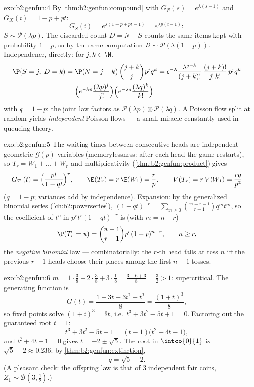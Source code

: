 \begin{solution}{exo:b2:genfun:4}
By \cref{thm:b2:genfun:compound} with $G_N(s) = e^{\lambda(s-1)}$
and $G_X(t) = 1 - p + pt$:
\[
G_S(t) = e^{\lambda(1 - p + pt - 1)} = e^{\lambda p(t - 1)} :
\]
$S \sim \mathcal{P}(\lambda p)$. The discarded count $D = N - S$
counts the same items kept with probability $1 - p$, so by the
same computation $D \sim \mathcal{P}(\lambda(1 - p))$.
Independence, directly: for $j, k \in \N$,
\begin{align*}
\P(S = j,\ D = k)
&= \P(N = j + k)\,\binom{j+k}{j}p^jq^k
= e^{-\lambda}\frac{\lambda^{j+k}}{(j+k)!}\,
\frac{(j+k)!}{j!\,k!}\,p^jq^k\\
&= \Bigl(e^{-\lambda p}\frac{(\lambda p)^j}{j!}\Bigr)
\Bigl(e^{-\lambda q}\frac{(\lambda q)^k}{k!}\Bigr)
\end{align*}
with $q = 1 - p$: the joint law factors as
$\mathcal{P}(\lambda p) \otimes \mathcal{P}(\lambda q)$. A Poisson
flow split at random yields \emph{independent} Poisson flows ---
a small miracle constantly used in queueing theory.
\end{solution}

\begin{solution}{exo:b2:genfun:5}
The waiting times between consecutive heads are independent
geometric $\mathcal{G}(p)$ variables (memorylessness: after each
head the game restarts), so $T_r = W_1 + \dots + W_r$ and
multiplicativity (\cref{thm:b2:genfun:product}) gives
\[
G_{T_r}(t) = \Bigl(\frac{pt}{1 - qt}\Bigr)^{r},
\qquad
\E(T_r) = r\,\E(W_1) = \frac rp,
\qquad
V(T_r) = r\,V(W_1) = \frac{rq}{p^2}
\]
($q = 1 - p$; variances add by independence). Expansion: by the
generalized binomial series
(\cref{ch:b2:powerseries}), $(1 - qt)^{-r} = \sum_{m\geq0}
\binom{m + r - 1}{r - 1}q^mt^m$, so the coefficient of $t^n$ in
$p^rt^r(1 - qt)^{-r}$ is (with $m = n - r$)
\[
\P(T_r = n) = \binom{n-1}{r-1}p^r(1-p)^{n-r},
\qquad n \geq r ,
\]
the \emph{negative binomial} law --- combinatorially: the $r$-th
head falls at toss $n$ iff the previous $r - 1$ heads choose their
places among the first $n - 1$ tosses.
\end{solution}

\begin{solution}{exo:b2:genfun:6}
$m = 1\cdot\frac38 + 2\cdot\frac38 + 3\cdot\frac18 = \frac{3 + 6 +
3}{8} = \frac32 > 1$: supercritical. The generating function is
\[
G(t) = \frac{1 + 3t + 3t^2 + t^3}{8} = \frac{(1 + t)^3}{8} ,
\]
so fixed points solve $(1 + t)^3 = 8t$, i.e.\ $t^3 + 3t^2 - 5t + 1
= 0$. Factoring out the guaranteed root $t = 1$:
\[
t^3 + 3t^2 - 5t + 1 = (t - 1)\bigl(t^2 + 4t - 1\bigr),
\]
and $t^2 + 4t - 1 = 0$ gives $t = -2 \pm \sqrt5$. The root in
$\intco{0}{1}$ is $\sqrt5 - 2 \approx 0.236$: by
\cref{thm:b2:genfun:extinction},
\[
q = \sqrt 5 - 2 .
\]
(A pleasant check: the offspring law is that of $3$ independent
fair coins, $Z_1 \sim \mathcal{B}(3, \frac12)$.)
\end{solution}

